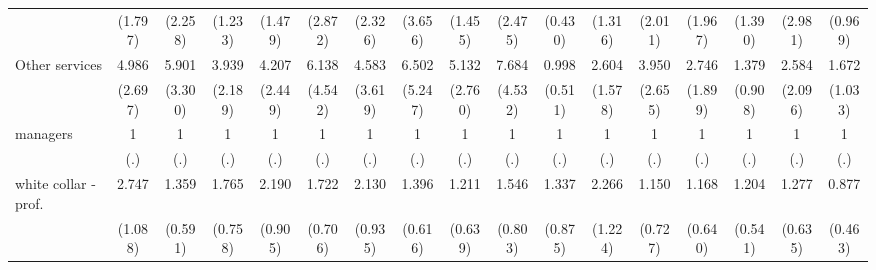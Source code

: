 {\begin{tabular}{l*{16}{c}}
                    &     (1.797)         &     (2.258)         &     (1.233)         &     (1.479)         &     (2.872)         &     (2.326)         &     (3.656)         &     (1.455)         &     (2.475)         &     (0.430)         &     (1.316)         &     (2.011)         &     (1.967)         &     (1.390)         &     (2.981)         &     (0.969)         \\
[1em]
Other services      &       4.986\sym{**} &       5.901\sym{**} &       3.939\sym{*}  &       4.207\sym{*}  &       6.138\sym{*}  &       4.583         &       6.502\sym{*}  &       5.132\sym{**} &       7.684\sym{***}&       0.998         &       2.604         &       3.950\sym{*}  &       2.746         &       1.379         &       2.584         &       1.672         \\
                    &     (2.697)         &     (3.300)         &     (2.189)         &     (2.449)         &     (4.542)         &     (3.619)         &     (5.247)         &     (2.760)         &     (4.532)         &     (0.511)         &     (1.578)         &     (2.655)         &     (1.899)         &     (0.908)         &     (2.096)         &     (1.033)         \\
[1em]
managers            &           1         &           1         &           1         &           1         &           1         &           1         &           1         &           1         &           1         &           1         &           1         &           1         &           1         &           1         &           1         &           1         \\
                    &         (.)         &         (.)         &         (.)         &         (.)         &         (.)         &         (.)         &         (.)         &         (.)         &         (.)         &         (.)         &         (.)         &         (.)         &         (.)         &         (.)         &         (.)         &         (.)         \\
[1em]
white collar - prof.&       2.747\sym{*}  &       1.359         &       1.765         &       2.190         &       1.722         &       2.130         &       1.396         &       1.211         &       1.546         &       1.337         &       2.266         &       1.150         &       1.168         &       1.204         &       1.277         &       0.877         \\
                    &     (1.088)         &     (0.591)         &     (0.758)         &     (0.905)         &     (0.706)         &     (0.935)         &     (0.616)         &     (0.639)         &     (0.803)         &     (0.875)         &     (1.224)         &     (0.727)         &     (0.640)         &     (0.541)         &     (0.635)         &     (0.463)         \\

\end{tabular}}
